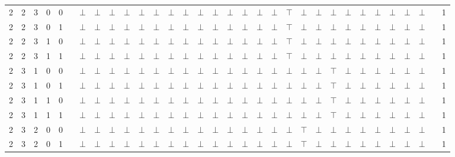 \documentclass[12pt]{extarticle}
\begin{document}
\begin{landscape}
\begin{tiny}
\begin{longtable}[c]{llllllllllllllllllllllllllllllll}
2 & 2 & 3 & 0 & 0 &  & $\bot$ & $\bot$ & $\bot$ & $\bot$ & $\bot$ & $\bot$ & $\bot$ & $\bot$ & $\bot$ & $\bot$ & $\bot$ & $\bot$ & $\bot$ & $\bot$ & $\top$ & $\bot$ & $\bot$ & $\bot$ & $\bot$ & $\bot$ & $\bot$ & $\bot$ & $\bot$ & $\bot$ &  & 1 \\
2 & 2 & 3 & 0 & 1 &  & $\bot$ & $\bot$ & $\bot$ & $\bot$ & $\bot$ & $\bot$ & $\bot$ & $\bot$ & $\bot$ & $\bot$ & $\bot$ & $\bot$ & $\bot$ & $\bot$ & $\top$ & $\bot$ & $\bot$ & $\bot$ & $\bot$ & $\bot$ & $\bot$ & $\bot$ & $\bot$ & $\bot$ &  & 1 \\
2 & 2 & 3 & 1 & 0 &  & $\bot$ & $\bot$ & $\bot$ & $\bot$ & $\bot$ & $\bot$ & $\bot$ & $\bot$ & $\bot$ & $\bot$ & $\bot$ & $\bot$ & $\bot$ & $\bot$ & $\top$ & $\bot$ & $\bot$ & $\bot$ & $\bot$ & $\bot$ & $\bot$ & $\bot$ & $\bot$ & $\bot$ &  & 1 \\
2 & 2 & 3 & 1 & 1 &  & $\bot$ & $\bot$ & $\bot$ & $\bot$ & $\bot$ & $\bot$ & $\bot$ & $\bot$ & $\bot$ & $\bot$ & $\bot$ & $\bot$ & $\bot$ & $\bot$ & $\top$ & $\bot$ & $\bot$ & $\bot$ & $\bot$ & $\bot$ & $\bot$ & $\bot$ & $\bot$ & $\bot$ &  & 1 \\
2 & 3 & 1 & 0 & 0 &  & $\bot$ & $\bot$ & $\bot$ & $\bot$ & $\bot$ & $\bot$ & $\bot$ & $\bot$ & $\bot$ & $\bot$ & $\bot$ & $\bot$ & $\bot$ & $\bot$ & $\bot$ & $\bot$ & $\bot$ & $\top$ & $\bot$ & $\bot$ & $\bot$ & $\bot$ & $\bot$ & $\bot$ &  & 1 \\
2 & 3 & 1 & 0 & 1 &  & $\bot$ & $\bot$ & $\bot$ & $\bot$ & $\bot$ & $\bot$ & $\bot$ & $\bot$ & $\bot$ & $\bot$ & $\bot$ & $\bot$ & $\bot$ & $\bot$ & $\bot$ & $\bot$ & $\bot$ & $\top$ & $\bot$ & $\bot$ & $\bot$ & $\bot$ & $\bot$ & $\bot$ &  & 1 \\
2 & 3 & 1 & 1 & 0 &  & $\bot$ & $\bot$ & $\bot$ & $\bot$ & $\bot$ & $\bot$ & $\bot$ & $\bot$ & $\bot$ & $\bot$ & $\bot$ & $\bot$ & $\bot$ & $\bot$ & $\bot$ & $\bot$ & $\bot$ & $\top$ & $\bot$ & $\bot$ & $\bot$ & $\bot$ & $\bot$ & $\bot$ &  & 1 \\
2 & 3 & 1 & 1 & 1 &  & $\bot$ & $\bot$ & $\bot$ & $\bot$ & $\bot$ & $\bot$ & $\bot$ & $\bot$ & $\bot$ & $\bot$ & $\bot$ & $\bot$ & $\bot$ & $\bot$ & $\bot$ & $\bot$ & $\bot$ & $\top$ & $\bot$ & $\bot$ & $\bot$ & $\bot$ & $\bot$ & $\bot$ &  & 1 \\
2 & 3 & 2 & 0 & 0 &  & $\bot$ & $\bot$ & $\bot$ & $\bot$ & $\bot$ & $\bot$ & $\bot$ & $\bot$ & $\bot$ & $\bot$ & $\bot$ & $\bot$ & $\bot$ & $\bot$ & $\bot$ & $\top$ & $\bot$ & $\bot$ & $\bot$ & $\bot$ & $\bot$ & $\bot$ & $\bot$ & $\bot$ &  & 1 \\
2 & 3 & 2 & 0 & 1 &  & $\bot$ & $\bot$ & $\bot$ & $\bot$ & $\bot$ & $\bot$ & $\bot$ & $\bot$ & $\bot$ & $\bot$ & $\bot$ & $\bot$ & $\bot$ & $\bot$ & $\bot$ & $\top$ & $\bot$ & $\bot$ & $\bot$ & $\bot$ & $\bot$ & $\bot$ & $\bot$ & $\bot$ &  & 1 \\

\end{longtable}
\end{tiny}
\end{landscape}
\end{document}
